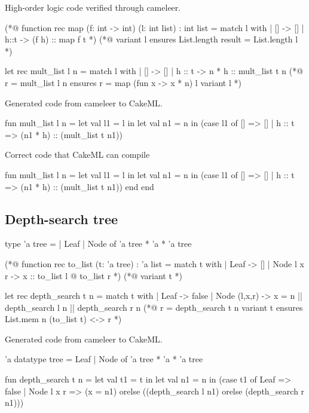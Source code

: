 High-order logic code verified through cameleer.

\begin{gospell}
    (*@ function rec map (f: int -> int) (l: int list) : int list = 
            match l with
            | [] -> []
            | h::t -> (f h) :: map f t *)
    (*@ variant l
            ensures List.length result = List.length l *)

    let rec mult_list l n =
        match l with
        | [] -> []
        | h :: t -> n * h :: mult_list t n
    (*@ r = mult_list l n
            ensures r = map (fun x -> x * n) l
            variant l *)
\end{gospell}

Generated code from cameleer to CakeML.

\begin{cakeml}
    fun mult_list l n = let val l1 = l in
        let val n1 = n in
        (case l1 of
            [] => []
        | h :: t => (n1 * h) :: (mult_list t n1))
\end{cakeml}

Correct code that CakeML can compile

\begin{cakeml}
    fun mult_list l n = let val l1 = l in
        let val n1 = n in
        (case l1 of
            [] => []
        | h :: t => (n1 * h) :: (mult_list t n1))
        end end
\end{cakeml}

\subsection{Depth-search tree}

\begin{gospell}
type 'a tree =
    | Leaf
    | Node of 'a tree * 'a * 'a tree

(*@ function rec to_list (t: 'a tree) : 'a list = 
  match t with
  | Leaf -> []
  | Node l x r -> x :: to_list l @ to_list r
*)
(*@
  variant t
*)

let rec depth_search t n = 
  match t with
  | Leaf -> false
  | Node (l,x,r) -> x = n || depth_search l n || depth_search r n
(*@
  r = depth_search t n
  variant t
  ensures List.mem n (to_list t) <-> r
*)
\end{gospell}

Generated code from cameleer to CakeML.

\begin{cakeml}
'a datatype tree = Leaf | Node of 'a tree * 'a * 'a tree

fun depth_search t n = let val t1 = t in
  let val n1 = n in
  (case t1 of
    Leaf => false
  | Node l x r =>
    (x = n1) orelse ((depth_search l n1) orelse (depth_search r n1)))
\end{cakeml}

